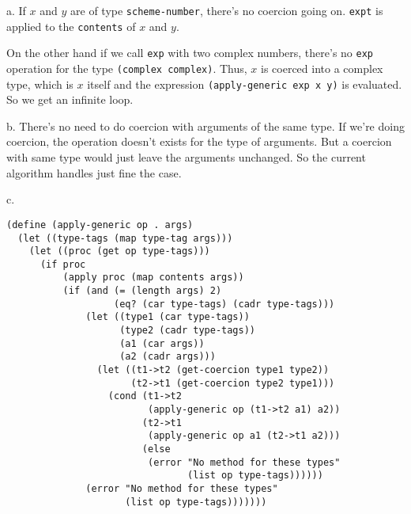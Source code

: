 \documentclass[a4paper,12pt]{article}
\newcommand{\subpar}[1] {\medskip \noindent #1.}
\begin{document}
\subpar{a} If $x$ and $y$ are of type \lstinline!scheme-number!,
there's no coercion going on.  \lstinline!expt! is applied to the
\lstinline!contents! of $x$ and $y$.

On the other hand if we call \lstinline!exp! with two complex numbers,
there's no \lstinline!exp! operation for the type
\lstinline!(complex complex)!.  Thus, $x$ is coerced into a complex
type, which is $x$ itself and the expression
\lstinline!(apply-generic exp x y)! is evaluated.  So we get an
infinite loop.

\subpar{b}  There's no need to do coercion with arguments of the same
type.  If we're doing coercion, the operation doesn't exists for the
type of arguments.  But a coercion with same type would just leave the
arguments unchanged.  So the current algorithm handles just fine the
case.

\subpar{c}
\begin{lstlisting}
(define (apply-generic op . args)
  (let ((type-tags (map type-tag args)))
    (let ((proc (get op type-tags)))
      (if proc
          (apply proc (map contents args))
          (if (and (= (length args) 2)
                   (eq? (car type-tags) (cadr type-tags)))
              (let ((type1 (car type-tags))
                    (type2 (cadr type-tags))
                    (a1 (car args))
                    (a2 (cadr args)))
                (let ((t1->t2 (get-coercion type1 type2))
                      (t2->t1 (get-coercion type2 type1)))
                  (cond (t1->t2
                         (apply-generic op (t1->t2 a1) a2))
                        (t2->t1
                         (apply-generic op a1 (t2->t1 a2)))
                        (else
                         (error "No method for these types"
                                (list op type-tags))))))
              (error "No method for these types"
                     (list op type-tags)))))))
\end{lstlisting}
\end{document}

